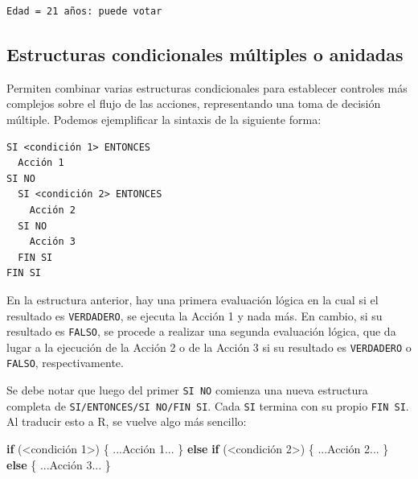 \documentclass[
]{book}
\newenvironment{Shaded}{\begin{snugshade}}{\end{snugshade}}
\newcommand{\ControlFlowTok}[1]{\textcolor[rgb]{0.13,0.29,0.53}{\textbf{#1}}}
\newcommand{\DecValTok}[1]{\textcolor[rgb]{0.00,0.00,0.81}{#1}}
\newcommand{\NormalTok}[1]{#1}
\newcommand{\SpecialCharTok}[1]{\textcolor[rgb]{0.00,0.00,0.00}{#1}}
\begin{document}
\begin{verbatim}
Edad = 21 años: puede votar
\end{verbatim}

\hypertarget{estructuras-condicionales-muxfaltiples-o-anidadas}{%
\subsection{Estructuras condicionales múltiples o anidadas}\label{estructuras-condicionales-muxfaltiples-o-anidadas}}

Permiten combinar varias estructuras condicionales para establecer controles más complejos sobre el flujo de las acciones, representando una toma de decisión múltiple. Podemos ejemplificar la sintaxis de la siguiente forma:

\begin{verbatim}
SI <condición 1> ENTONCES
  Acción 1
SI NO
  SI <condición 2> ENTONCES
    Acción 2
  SI NO
    Acción 3
  FIN SI
FIN SI
\end{verbatim}

En la estructura anterior, hay una primera evaluación lógica en la cual si el resultado es \texttt{VERDADERO}, se ejecuta la Acción 1 y nada más. En cambio, si su resultado es \texttt{FALSO}, se procede a realizar una segunda evaluación lógica, que da lugar a la ejecución de la Acción 2 o de la Acción 3 si su resultado es \texttt{VERDADERO} o \texttt{FALSO}, respectivamente.

Se debe notar que luego del primer \texttt{SI\ NO} comienza una nueva estructura completa de \texttt{SI/ENTONCES/SI\ NO/FIN\ SI}. Cada \texttt{SI} termina con su propio \texttt{FIN\ SI}. Al traducir esto a R, se vuelve algo más sencillo:

\begin{Shaded}
\begin{Highlighting}[]
\ControlFlowTok{if}\NormalTok{ (}\SpecialCharTok{\textless{}}\NormalTok{condición }\DecValTok{1}\SpecialCharTok{\textgreater{}}\NormalTok{) \{}
\NormalTok{    ...Acción }\DecValTok{1}\NormalTok{...}
\NormalTok{\} }\ControlFlowTok{else} \ControlFlowTok{if}\NormalTok{ (}\SpecialCharTok{\textless{}}\NormalTok{condición }\DecValTok{2}\SpecialCharTok{\textgreater{}}\NormalTok{) \{}
\NormalTok{    ...Acción }\DecValTok{2}\NormalTok{...}
\NormalTok{\} }\ControlFlowTok{else}\NormalTok{ \{}
\NormalTok{    ...Acción }\DecValTok{3}\NormalTok{...}
\NormalTok{\}}
\end{Highlighting}
\end{Shaded}
\end{document}
